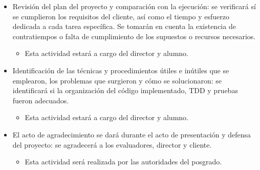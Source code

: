 \documentclass[
11pt, %
]{charter}
\begin{document}
\begin{itemize}
	\item Revisión del plan del proyecto y comparación con la ejecución: se verificará sí se cumplieron los requisitos del cliente, así como el tiempo y esfuerzo dedicada a cada tarea específica. Se tomarán en cuenta la existencia de contratiempos o falta de cumplimiento de los supuestos o recursos necesarios.
	\begin{itemize}
		\item Esta actividad estará a cargo del director y alumno.	
	\end{itemize}	 
	
	\item Identificación de las técnicas y procedimientos útiles e inútiles que se emplearon, los problemas que surgieron y cómo se solucionaron: se identificará si la organización del código implementado, TDD y pruebas fueron adecuados.
	\begin{itemize}
		\item Esta actividad estará a cargo del director y alumno.	
	\end{itemize}	 	
	
	\item El acto de agradecimiento se dará durante el acto de presentación y defensa del proyecto: se agradecerá a los evaluadores, director y cliente.
	\begin{itemize}
		\item Esta actividad será realizada por las autoridades del posgrado.	
	\end{itemize}	 
\end{itemize}
\end{document}
